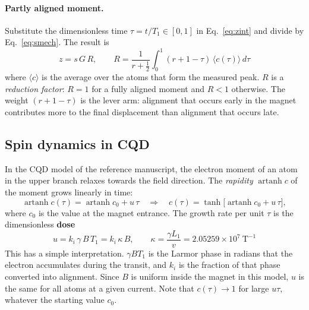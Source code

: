\documentclass[11pt,a4paper]{article}
\newcommand{\artanh}{\operatorname{artanh}}
\begin{document}
\paragraph{Partly aligned moment.} Substitute the dimensionless time $\tau = t/T_1 \in [0,1]$ in Eq.~\eqref{eq:zint} and divide by Eq.~\eqref{eq:smech}. The result is
\begin{equation}
\boxed{\;z = s\,G\,R, \qquad R = \frac{1}{r + \tfrac12}\int_0^1 (r + 1 - \tau)\,\langle c(\tau)\rangle\, d\tau\;}
\label{eq:Rdef}
\end{equation}
where $\langle c\rangle$ is the average over the atoms that form the measured peak. $R$ is a \emph{reduction factor}: $R=1$ for a fully aligned moment and $R<1$ otherwise. The weight $(r+1-\tau)$ is the lever arm: alignment that occurs early in the magnet contributes more to the final displacement than alignment that occurs late.

\subsection{Spin dynamics in CQD}
\label{sec:spin}
In the CQD model of the reference manuscript, the electron moment of an atom in the upper branch relaxes towards the field direction. The \emph{rapidity} $\artanh c$ of the moment grows linearly in time:
\begin{equation}
\artanh c(\tau) = \artanh c_0 + u\,\tau
\quad\Longrightarrow\quad
c(\tau) = \tanh\!\big[\artanh c_0 + u\,\tau\big],
\label{eq:tanh}
\end{equation}
where $c_0$ is the value at the magnet entrance. The growth rate per unit $\tau$ is the dimensionless \textbf{dose}
\begin{equation}
\boxed{\;u = k_i\,\gamma\,B\,T_1 = k_i\,\kappa\,B, \qquad \kappa = \frac{\gamma L_1}{v} = 2.05259\times10^{7}\ \text{T}^{-1}\;}
\label{eq:dose}
\end{equation}
\noindent This has a simple interpretation. $\gamma B T_1$ is the Larmor phase in radians that the electron accumulates during the transit, and $k_i$ is the fraction of that phase converted into alignment. Since $B$ is uniform inside the magnet in this model, $u$ is the same for all atoms at a given current. Note that $c(\tau)\to 1$ for large $u\tau$, whatever the starting value $c_0$.
\end{document}
